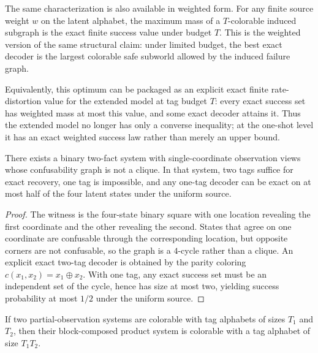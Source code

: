 The same characterization is also available in weighted form. For any finite source weight $w$ on the latent alphabet, the maximum mass of a $T$-colorable induced subgraph is the exact finite success value under budget $T$. This is the weighted version of the same structural claim: under limited budget, the best exact decoder is the largest colorable safe subworld allowed by the induced failure graph.

Equivalently, this optimum can be packaged as an explicit exact finite rate-distortion value for the extended model at tag budget $T$: every exact success set has weighted mass at most this value, and some exact decoder attains it. Thus the extended model no longer has only a converse inequality; at the one-shot level it has an exact weighted success law rather than merely an upper bound.

\begin{theorem}\label{thm:multifact-nonclique}
There exists a binary two-fact system with single-coordinate observation views whose confusability graph is not a clique. In that system, two tags suffice for exact recovery, one tag is impossible, and any one-tag decoder can be exact on at most half of the four latent states under the uniform source.
\end{theorem}

\begin{proof}
The witness is the four-state binary square with one location revealing the first coordinate and the other revealing the second. States that agree on one coordinate are confusable through the corresponding location, but opposite corners are not confusable, so the graph is a $4$-cycle rather than a clique. An explicit exact two-tag decoder is obtained by the parity coloring $c(x_1,x_2)=x_1\oplus x_2$. With one tag, any exact success set must be an independent set of the cycle, hence has size at most two, yielding success probability at most $1/2$ under the uniform source.
\end{proof}

\begin{theorem}\label{thm:multifact-product}
If two partial-observation systems are colorable with tag alphabets of sizes $T_1$ and $T_2$, then their block-composed product system is colorable with a tag alphabet of size $T_1T_2$.
\end{theorem}

